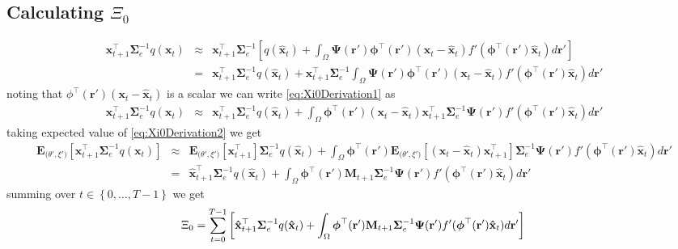 \documentclass[]{article}
\begin{document}
\subsection*{Calculating $\Xi_0$}
\begin{eqnarray}\label{eq:Xi0Derivation1}
 \mathbf x_{t+1}^\top\boldsymbol\Sigma_e^{-1}q( \mathbf x_t) &\approx&  \mathbf x_{t+1}^\top\boldsymbol\Sigma_e^{-1}\left[q(\mathbf {\hat x}_t)+\int_\Omega \boldsymbol{\Psi}(\mathbf{r}')\boldsymbol \phi^\top(\mathbf r') (\mathbf x_t - \mathbf  {\hat x}_t)f'(\boldsymbol \phi^\top(\mathbf r')\mathbf {\hat x}_t) d\mathbf{r}'\right] \nonumber \\
&=&\mathbf x_{t+1}^\top\boldsymbol\Sigma_e^{-1}q(\mathbf {\hat x}_t)+\mathbf x_{t+1}^\top\boldsymbol\Sigma_e^{-1}\int_\Omega \boldsymbol{\Psi}(\mathbf{r}')\boldsymbol \phi^\top(\mathbf r') (\mathbf x_t - \mathbf  {\hat x}_t)f'(\boldsymbol \phi^\top(\mathbf r')\mathbf {\hat x}_t) d\mathbf{r}'
\end{eqnarray}
noting that $\phi^\top(\mathbf r') (\mathbf x_t - \mathbf  {\hat x}_t)$ is a scalar we can write \ref{eq:Xi0Derivation1} as 
\begin{eqnarray}\label{eq:Xi0Derivation2}
 \mathbf x_{t+1}^\top\boldsymbol\Sigma_e^{-1}q( \mathbf x_t) &\approx& \mathbf x_{t+1}^\top\boldsymbol\Sigma_e^{-1}q(\mathbf {\hat x}_t)+\int_\Omega \boldsymbol \phi^\top(\mathbf r') (\mathbf x_t - \mathbf  {\hat x}_t)\mathbf x_{t+1}^\top\boldsymbol\Sigma_e^{-1}    \boldsymbol{\Psi}(\mathbf{r}')f'(\boldsymbol \phi^\top(\mathbf r')\mathbf {\hat x}_t) d\mathbf{r}'
\end{eqnarray}
taking expected value of \ref{eq:Xi0Derivation2} we get 
\begin{eqnarray}\label{eq:Xi0Derivation3}
 \mathbf E_{\boldsymbol (\theta',\xi')}\left[\mathbf x_{t+1}^\top\boldsymbol\Sigma_e^{-1}q( \mathbf x_t)\right] &\approx& \mathbf E_{\boldsymbol (\theta',\xi')}\left[\mathbf x_{t+1}^\top\right]\boldsymbol\Sigma_e^{-1}q(\mathbf {\hat x}_t)+\int_\Omega \boldsymbol \phi^\top(\mathbf r')  \mathbf E_{\boldsymbol (\theta',\xi')}\left[(\mathbf x_t - \mathbf  {\hat x}_t)\mathbf x_{t+1}^\top\right]\boldsymbol\Sigma_e^{-1}    \boldsymbol{\Psi}(\mathbf{r}')f'(\boldsymbol \phi^\top(\mathbf r')\mathbf {\hat x}_t) d\mathbf{r}' \nonumber \\
&=&\mathbf {\hat x}_{t+1}^\top\boldsymbol\Sigma_e^{-1}q(\mathbf {\hat x}_t)+\int_\Omega \boldsymbol \phi^\top(\mathbf r') \mathbf M_{t+1}\boldsymbol\Sigma_e^{-1}    \boldsymbol{\Psi}(\mathbf{r}')f'(\boldsymbol \phi^\top(\mathbf r')\mathbf {\hat x}_t) d\mathbf{r}'
\end{eqnarray}
summing over $t \in \left\lbrace 0, \dots, T-1\right\rbrace $ we get
\begin{equation}
\Xi_0=\sum_{t=0}^{T-1}\left[ \mathbf{\hat x}_{t+1}^\top\boldsymbol\Sigma_e^{-1}q(\mathbf{\hat x}_t)+\int_\Omega\boldsymbol \phi^\top(\mathbf r') \mathbf M_{t+1} \boldsymbol\Sigma_e^{-1}  \boldsymbol{\Psi}(\mathbf{r}') f'(\boldsymbol \phi^\top(\mathbf r')\mathbf {\hat x}_t) d\mathbf{r}'\right] \\	
\end{equation}
\end{document}
